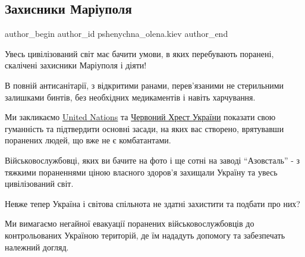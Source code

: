  
 
 
 
 
 
\subsection{Захисники Маріуполя}
\label{sec:10_05_2022.fb.pshenychna_olena.kiev.1.zahysnyky_mariupolja}
 
\ifcmt
 author_begin
   author_id pshenychna_olena.kiev
 author_end
\fi

Увесь цивілізований світ має бачити умови, в яких перебувають поранені,
скалічені захисники Маріуполя і діяти!

В повній антисанітарії, з відкритими ранами, перев'язаними не стерильними
залишками бинтів, без необхідних медикаментів і навіть харчування.


Ми закликаємо \href{https://www.facebook.com/unitednations}{United Nations} та
\href{https://www.facebook.com/RedCrossUkraine/}{Червоний Хрест України}
показати свою гуманність та підтвердити основні засади, на яких вас створено,
врятувавши поранених людей, що вже не є комбатантами. 

Військовослужбовці, яких ви бачите на фото і ще сотні на заводі
\enquote{Азовсталь} - з тяжкими пораненнями ціною власного здоров'я захищали
Україну та увесь цивілізований світ. 


Невже тепер Україна і світова спільнота не здатні захистити та подбати про них?

Ми вимагаємо негайної евакуації поранених військовослужбовців до контрольованих
Україною територій, де їм нададуть допомогу та забезпечать належний догляд.



